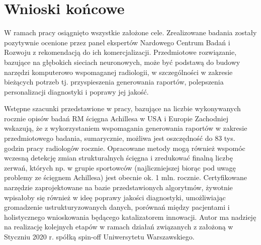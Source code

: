 {\let\clearpage\relax\chapter*{Wnioski końcowe}}

W ramach pracy osiągnięto wszystkie założone cele. Zrealizowane badania zostały pozytywnie ocenione przez panel ekspertów Nardowego Centrum Badań i Rozwoju z rekomendacją do ich komercjalizacji. Przedmiotowe rozwiązanie, bazujące na głębokich sieciach neuronowych, może być podstawą do budowy narzędzi komputerowo wspomaganej radiologii, w szczególności w zakresie bieżących potrzeb tj. przyspieszenia generowania raportów, polepszenia personalizacji diagnostyki i poprawy jej jakość.

Wstępne szacunki przedstawione w pracy, bazujące na liczbie wykonywanych rocznie opisów badań RM ścięgna Achillesa w USA i Europie Zachodniej wskazują, że z wykorzystaniem wspomagania generowania raportów w zakresie przedmiotowego badania, sumarycznie, możliwa jest oszczędność do 83 tys. godzin pracy radiologów rocznie. Opracowane metody mogą również wspomóc wczesną detekcję zmian strukturalnych ścięgna i zredukować finalną liczbę zerwań, których np. w grupie sportowców (najliczniejszej biorąc pod uwagę problemy ze ścięgnem Achillesa) jest obecnie ok. 1 mln. rocznie. Certyfikowane narzędzie zaprojektowane na bazie przedstawionych algorytmów, żywotnie wpisałoby się również w ideę poprawy jakości diagnostyki, umożliwiając gromadzenie ustrukturyzowanych danych, porównań między pacjentami i holistycznego wnioskowania będącego katalizatorem innowacji. Autor ma nadzieję na realizację kolejnych etapów w ramach działań związanych z założoną w Styczniu 2020 r. spółką spin-off Uniwersytetu Warszawskiego.
